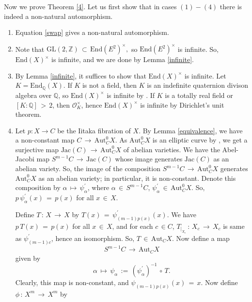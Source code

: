 \documentclass[12pt,reqno]{amsart}
\theoremstyle{definition}
\numberwithin{equation}{section}
\begin{document}
Now we prove Theorem \ref{4}. Let us first show that in cases $(1)-(4)$ there is indeed a non-natural automorphism.

 \begin{enumerate}
     \item Equation \ref{swap} gives a non-natural automorphism. 
     \item Note that $\textrm{GL}(2, \mathbb{Z})\,\subset\, \textrm{End}(E^{2})^{\times},$ so $\textrm{End}(E^{2})^{\times}$ is infinite. So, $\textrm{End}(X)^{\times}$ is infinite, and we are done by Lemma \ref{infinite}.
     \item By Lemma \ref{infinite}, it suffices to show that $\textrm{End}(X)^\times$ is infinite. Let $K=\textrm{End}_{\mathbb{Q}}(X).$ If $K$ is not a field, then $K$ is an indefinite quaternion divison algebra over $\mathbb{Q}$, so $\textrm{End}(X)^\times$  is infinite by \cite[Appendix]{GV}. If $K$ is a totally real field or $[K:\mathbb{Q}]\,>\, 2$, then $\mathcal{O}^{\times}_{K}$, hence $\textrm{End}(X)^\times$ is infinite by Dirichlet's unit theorem.

     \item Let $p:X\to C$ be the Iitaka fibration of $X$. By Lemma \ref{equivalence}, we have a non-constant map $C\,\longrightarrow\, \textrm{Aut}^{0}_{C}X$. As $\textrm{Aut}^{0}_{C}X$ is an elliptic curve by \cite{Fon}, we get a surjective map $\textrm{Jac}(C)\,\longrightarrow\, \textrm{Aut}^{0}_{C}X$ of abelian varieties. We have the Abel-Jacobi map $S^{m-1}C\,\longrightarrow\, \textrm{Jac}(C)$ whose image generates $\textrm{Jac}(C)$ as an abelian variety. So, the image of the composition $S^{m-1}C\,\longrightarrow\, \textrm{Aut}^{0}_{C}X$ generates $\textrm{Aut}^{0}_{C}X$ as an abelian variety; in particular, it is non-constant. Denote this composition by $\alpha\,\longmapsto\, \psi_{\alpha}^{\prime}$, where $\alpha\,\in\, S^{m-1}C$, $\psi_{\alpha}^{\prime}\,\in\,\textrm{Aut}^{0}_{C}X$. So, $p\,\psi^{\prime}_{\alpha}(x)\,=\, p(x)$ for all $x\,\in\,X$.
     
     Define $T\,:\,X\,\longrightarrow\, X$ by $T(x)\,=\, \psi^{\prime}_{(m-1)p(x)}(x)$. We have $p\,T(x)\,=\, p(x)$ for all $x\,\in\,X$, and for each $c\,\in C$, $T_{|_{X_{c}}}\,:\, X_{c}\,\longrightarrow\, X_{c}$ is same as $\psi^{\prime}_{(m-1)c}$, hence an isomorphism. So, $T\,\in\, \textrm{Aut}_{C}X$. Now define a map 
\begin{equation*}
S^{m-1}C\,\longrightarrow\, \textrm{Aut}_{C}X    
\end{equation*}
given by 
\begin{equation*}
\alpha\,\longmapsto\,  \psi_{\alpha}\,:=\, (\psi^{\prime}_{\alpha})^{-1}\,\circ\, T.   
\end{equation*}
Clearly, this map is non-constant, and $\psi_{(m-1)p(x)}(x)\,=\,x$. Now define $\phi\,:\, X^{m}\,\longrightarrow\, X^{m}$ by 


\end{enumerate}
\end{document}
